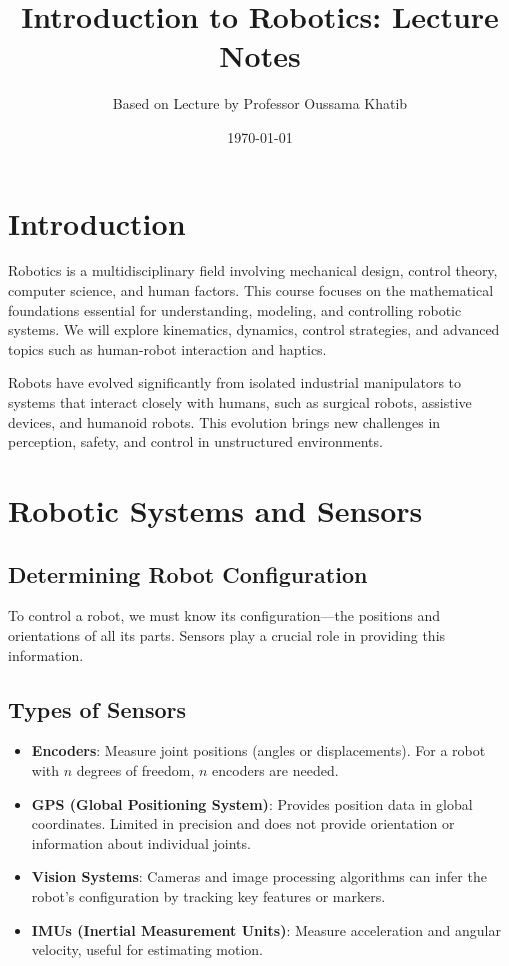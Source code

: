 \documentclass{article}
\title{Introduction to Robotics: Lecture Notes}
\author{Based on Lecture by Professor Oussama Khatib}
\date{\today}
\begin{document}
\maketitle
\tableofcontents

\section{Introduction}

Robotics is a multidisciplinary field involving mechanical design, control theory, computer science, and human factors. This course focuses on the mathematical foundations essential for understanding, modeling, and controlling robotic systems. We will explore kinematics, dynamics, control strategies, and advanced topics such as human-robot interaction and haptics.

Robots have evolved significantly from isolated industrial manipulators to systems that interact closely with humans, such as surgical robots, assistive devices, and humanoid robots. This evolution brings new challenges in perception, safety, and control in unstructured environments.

\section{Robotic Systems and Sensors}

\subsection{Determining Robot Configuration}

To control a robot, we must know its configuration—the positions and orientations of all its parts. Sensors play a crucial role in providing this information.

\subsection{Types of Sensors}

\begin{itemize}
    \item \textbf{Encoders}: Measure joint positions (angles or displacements). For a robot with $n$ degrees of freedom, $n$ encoders are needed.
    \item \textbf{GPS (Global Positioning System)}: Provides position data in global coordinates. Limited in precision and does not provide orientation or information about individual joints.
    \item \textbf{Vision Systems}: Cameras and image processing algorithms can infer the robot's configuration by tracking key features or markers.
    \item \textbf{IMUs (Inertial Measurement Units)}: Measure acceleration and angular velocity, useful for estimating motion.
\end{itemize}
\end{document}
